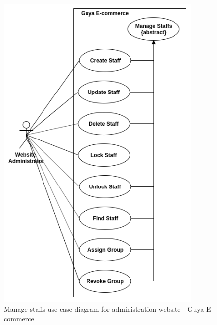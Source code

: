 \begin{figure}[!ht]
\centering
\includegraphics[width=10cm,keepaspectratio]{usecases/manage_staffs}
\caption{Manage staffs use case diagram for administration website - Guya E-commerce}
\end{figure}
